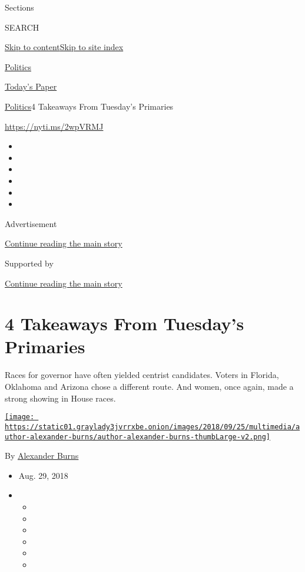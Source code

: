 Sections

SEARCH

\protect\hyperlink{site-content}{Skip to
content}\protect\hyperlink{site-index}{Skip to site index}

\href{https://www.nytimes3xbfgragh.onion/section/politics}{Politics}

\href{https://myaccount.nytimes3xbfgragh.onion/auth/login?response_type=cookie\&client_id=vi}{}

\href{https://www.nytimes3xbfgragh.onion/section/todayspaper}{Today's
Paper}

\href{/section/politics}{Politics}\textbar{}4 Takeaways From Tuesday's
Primaries

\url{https://nyti.ms/2wpVRMJ}

\begin{itemize}
\item
\item
\item
\item
\item
\item
\end{itemize}

Advertisement

\protect\hyperlink{after-top}{Continue reading the main story}

Supported by

\protect\hyperlink{after-sponsor}{Continue reading the main story}

\hypertarget{4-takeaways-from-tuesdays-primaries}{%
\section{4 Takeaways From Tuesday's
Primaries}\label{4-takeaways-from-tuesdays-primaries}}

Races for governor have often yielded centrist candidates. Voters in
Florida, Oklahoma and Arizona chose a different route. And women, once
again, made a strong showing in House races.

\href{http://www.nytimes3xbfgragh.onion/by/alexander-burns}{\texttt{[image: https://static01.graylady3jvrrxbe.onion/images/2018/09/25/multimedia/author-alexander-burns/author-alexander-burns-thumbLarge-v2.png]}}

By \href{http://www.nytimes3xbfgragh.onion/by/alexander-burns}{Alexander
Burns}

\begin{itemize}
\item
  Aug. 29, 2018
\item
  \begin{itemize}
  \item
  \item
  \item
  \item
  \item
  \item
  \end{itemize}
\end{itemize}

